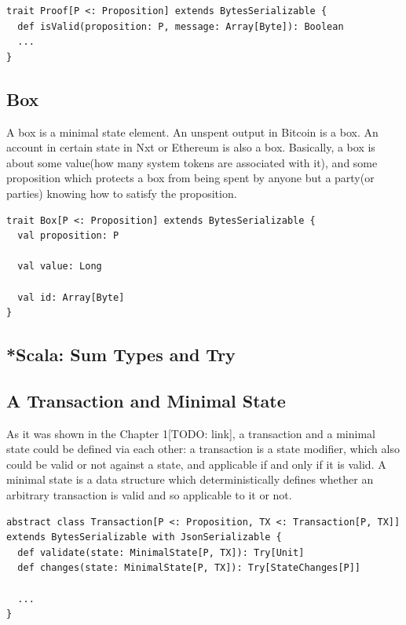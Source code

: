 \documentclass[]{report}   %
\begin{document}
\begin{lstlisting}
trait Proof[P <: Proposition] extends BytesSerializable {
  def isValid(proposition: P, message: Array[Byte]): Boolean
  ...
}
\end{lstlisting}


\subsection{Box}

A box is a minimal state element. An unspent output in Bitcoin is a box. An account in certain state in Nxt or Ethereum is also a box. Basically, a box is about some value(how many system tokens are associated with it), and some proposition which protects a box from being spent by anyone but a party(or parties) knowing how to satisfy the proposition.

\begin{lstlisting}
trait Box[P <: Proposition] extends BytesSerializable {
  val proposition: P

  val value: Long

  val id: Array[Byte]
}
\end{lstlisting}


\subsection{*Scala: Sum Types and Try}

\subsection{A Transaction and Minimal State}

As it was shown in the Chapter 1[TODO: link], a transaction and a minimal state could be defined via each other: a transaction is a state modifier, which also could be valid or not against a state, and applicable if and only if it is valid. A minimal state is a data structure which deterministically defines whether an arbitrary transaction is valid and so applicable to it or not. 

\begin{lstlisting}
abstract class Transaction[P <: Proposition, TX <: Transaction[P, TX]] extends BytesSerializable with JsonSerializable {
  def validate(state: MinimalState[P, TX]): Try[Unit]
  def changes(state: MinimalState[P, TX]): Try[StateChanges[P]]

  ...
}
\end{lstlisting}
\end{document}
